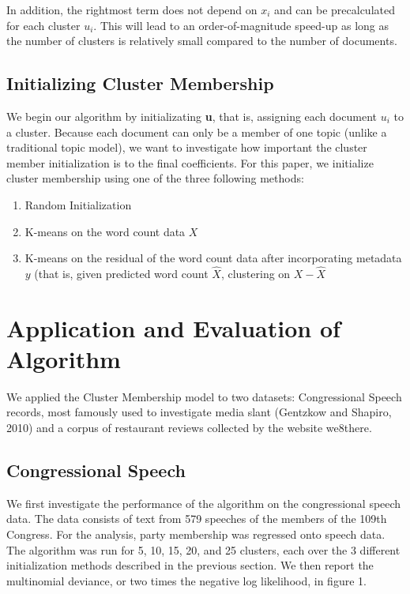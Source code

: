 \documentclass[12pt]{article}
\begin{document}
In addition, the rightmost term does not depend on $x_i$ and can be precalculated for each cluster $u_i$. This will lead to an order-of-magnitude speed-up as long as the number of clusters is relatively small compared to the number of documents. 


\subsection{Initializing Cluster Membership}

We begin our algorithm by initializating \textbf{u}, that is, assigning each document $u_i$ to a cluster. 
Because each document can only be a member of one topic (unlike a traditional topic model), we want to investigate how important the cluster member initialization is to the final coefficients. 
For this paper, we initialize cluster membership using one of the three following
methods:

\begin{enumerate}
\def\labelenumi{\arabic{enumi}.}
\itemsep1pt\parskip0pt
\item
  Random Initialization
\item
  K-means on the word count data $X$
\item
  K-means on the residual of the word count data after incorporating
  metadata $y$ (that is, given predicted word count $\hat{X}$,
  clustering on $X-\hat{X}$
\end{enumerate}


\section{Application and Evaluation of Algorithm}\label{application}

We applied the Cluster Membership model to two datasets: Congressional Speech records, most famously used to investigate media slant (Gentzkow and Shapiro, 2010) and a corpus of restaurant reviews collected by the website we8there.

\subsection{Congressional Speech} 

We first investigate the performance of the algorithm on the congressional speech data. The data consists of text from 579 speeches of the members of the 109th Congress. For the analysis, party membership was regressed onto speech data. The algorithm was run for 5, 10, 15, 20, and 25 clusters, each over the 3 different initialization methods described in the previous section. We then report the multinomial deviance, or two times the negative log likelihood, in figure 1. 
\end{document}
